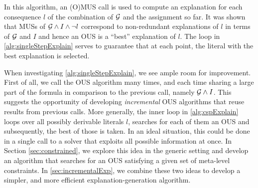In this algorithm, an (O)MUS call is used to compute an explanation for each consequence $l$ of the combination of $\mathcal{G} $ and the assignment so far. 
It was shown that MUSs of $\mathcal{G} \land I\land\lnot l$ correspond to non-redundant explanations of $l$ in terms of $\mathcal{G} $ and $I$ and hence an OUS is a ``best'' explanation of $l$. 
The loop in \cref{alg:singleStepExplain} serves to guarantee that at each point, the literal with the best explanation is selected. 





When investigating \cref{alg:singleStepExplain}, we see ample room for improvement. 
First of all, we call the OUS algorithm many times, and each time sharing a large part of the formula in comparison to the previous call, namely $\mathcal{G}  \land I$.
This suggests the opportunity of developing \emph{incremental} OUS algorithms that reuse results from previous calls. 
More generally, the inner loop in \cref{alg:cspExplain} loops over all possibly derivable  literals $l$, searches for each of them an OUS and subsequently, the best of those is taken. 
In an ideal situation, this could be done in a single call to a solver that exploits all possible information at once. 
In Section \ref{sec:constrained}, we explore this idea in the generic setting and develop an algorithm that searches for an OUS satisfying a given set of meta-level constraints. 
In \cref{sec:incrementalExp}, we combine these two ideas to develop a simpler, and more efficient explanation-generation algorithm. 
